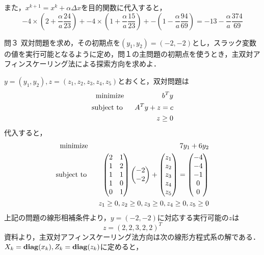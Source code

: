 \documentclass[a4paper,11pt]{jsarticle}
\numberwithin{theorem}{section}  %
\numberwithin{equation}{section} %
\newcommand{\st}{\mathop{\rm subject~to\,}\limits}
\newcommand{\diag}{\mathop{\mathrm{\bf diag}}\nolimits}
\newcommand{\minimize}{\mathop{\mathrm{\rm minimize}}\limits}
\begin{document}
また，$x^{k+1} = x^k +\alpha \Delta x$を目的関数に代入すると，
\[
-4\times(2 + \frac{\alpha}{a}\frac{24}{23}) +
-4\times(1 + \frac{\alpha}{a}\frac{15}{23}) +
-(1 - \frac{\alpha}{a}\frac{94}{69}) = -13 - \frac{\alpha}{a} \frac{374}{69}
\]

\begin{itembox}[l]{問３}
双対問題を求め，その初期点を$(y_1,y_2)=(-2,-2)$とし，スラック変数の値を実行可能となるように定め，問１の主問題の初期点を使うとき，主双対アフィンスケーリング法による探索方向を求めよ．
\end{itembox}
$y=(y_1,y_2), z=(z_1,z_2,z_3,z_4,z_5)$とおくと，双対問題は
\begin{eqnarray*}
\minimize \,\,\, && b^Ty\\
\st \,\,\, && A^Ty+z = c\\
&& z \ge 0
\end{eqnarray*}
代入すると，
\begin{eqnarray*}
\minimize \,\,\, && 7y_1 + 6y_2\\
\st \,\,\, && \begin{pmatrix}
2&1\\ 1&2\\ 1&1\\ 1&0\\ 0&1
\end{pmatrix}\begin{pmatrix}-2\\-2\end{pmatrix} + \begin{pmatrix}
z_1 \\ z_2 \\ z_3 \\ z_4 \\ z_5
\end{pmatrix}  = \begin{pmatrix}
-4\\-4\\-1\\0\\0
\end{pmatrix}\\
&& z_1 \ge 0, z_2 \ge 0, z_3 \ge 0, z_4 \ge 0, z_5 \ge 0
\end{eqnarray*}
上記の問題の線形相補条件より，$y=(-2,-2)$に対応する実行可能の$z$は
\[
z = (2, 2, 3, 2, 2)^T 
\]
資料より，主双対アフィンスケーリング法方向は次の線形方程式系の解である．$X_k=\diag(x_k),Z_k=\diag(z_k)$に定めると，
\end{document}
